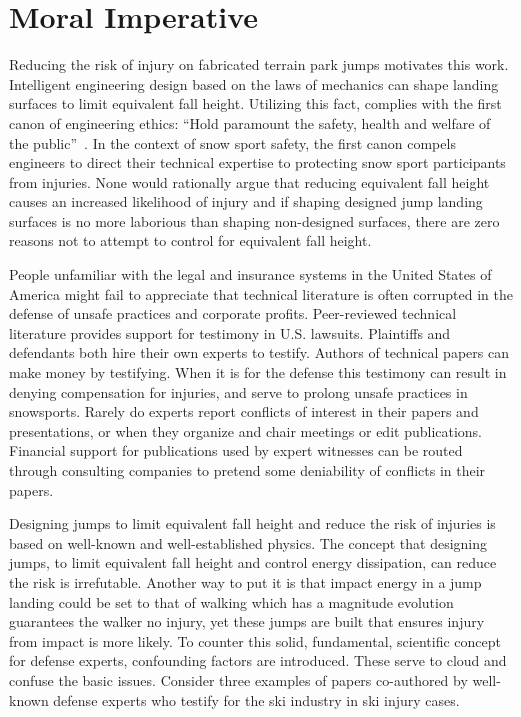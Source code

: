 \documentclass{article}
\begin{document}
\section{Moral Imperative}
%
Reducing the risk of injury on fabricated terrain park jumps motivates this
work. Intelligent engineering design based on the laws of mechanics can shape
landing surfaces to limit equivalent fall height. Utilizing this fact, complies with
the first canon of engineering ethics: ``Hold paramount the safety, health and
welfare of the public''~\cite{NSPE2019}. In the context of snow sport safety,
the first canon compels engineers to direct their technical expertise to
protecting snow sport participants from injuries. None would rationally argue
that reducing equivalent fall height causes an increased likelihood of injury
and if shaping designed jump landing surfaces is no more laborious than shaping
non-designed surfaces, there are zero reasons not to attempt to control for
equivalent fall height.

People unfamiliar with the legal and insurance systems in the United States of
America might fail to appreciate that technical literature is often corrupted in the
defense of unsafe practices and corporate profits. Peer-reviewed technical
literature provides support for testimony in U.S. lawsuits. Plaintiffs and
defendants both hire their own experts to testify. Authors of technical papers
can make money by testifying. When it is for the defense this testimony can
result in denying compensation for injuries, and serve to prolong unsafe
practices in snowsports. Rarely do experts report conflicts of interest in
their papers and presentations, or when they organize and chair meetings or
edit publications. Financial support for publications used by expert witnesses
can be routed through consulting companies to pretend some deniability of
conflicts in their papers.

Designing jumps to limit equivalent fall height and reduce the risk of injuries
is based on well-known and well-established physics. The concept that designing
jumps, to limit equivalent fall height and control energy dissipation,
can reduce the risk is irrefutable. Another way to put it is that impact energy
in a jump landing could be set to that of walking which has a magnitude
evolution guarantees the walker no injury, yet these jumps are built that
ensures injury from impact is more likely. To counter this solid, fundamental,
scientific concept for defense experts, confounding factors are introduced.
These serve to cloud and confuse the basic issues. Consider three examples of
papers co-authored by well-known defense experts who testify for the ski
industry in ski injury cases.
\end{document}

